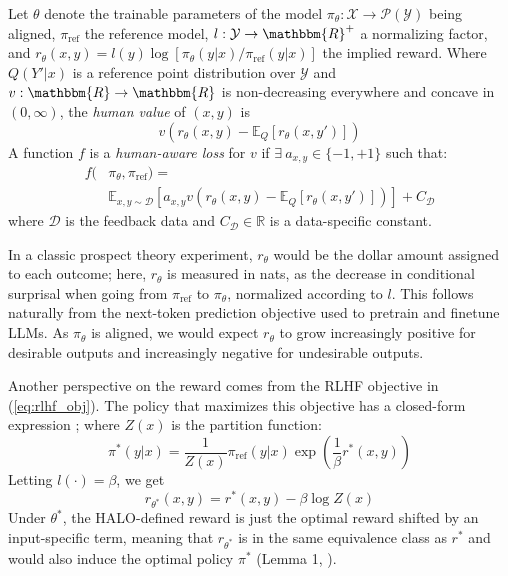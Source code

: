 \begin{definition}
    Let $\theta$ denote the trainable parameters of the model $\pi_\theta: \mathcal{X} \to \mathcal{P}(\mathcal{Y})$ being aligned, $\pi_\text{ref}$ the reference model, $l: \mathcal{Y} \to \mathbbm{R}^+$ a normalizing factor, and $r_\theta(x,y) = {l(y)} \log [\pi_\theta(y|x) / \pi_\text{ref}(y|x)]$ the implied reward.
    Where $Q(Y'|x)$ is a reference point distribution over $\mathcal{Y}$  and $v: \mathbbm{R} \to \mathbbm{R}$ is non-decreasing everywhere and concave in $(0, \infty)$, the \textit{human value} of $(x,y)$ is 
    \begin{equation}
        v(r_\theta(x,y) - \mathbb{E}_{Q}[r_\theta(x,y')])
    \end{equation}
    A function $f$ is a \textit{human-aware loss} for $v$ if $\exists\ a_{x,y} \in \{-1, +1\}$ such that:
    \begin{equation}
    \begin{split}
        f(& \pi_\theta, \pi_\text{ref}) = \\  & \mathbb{E}_{x,y\sim\mathcal{D}}[ a_{x,y} v(r_\theta(x,y) - \mathbb{E}_{Q}[r_\theta(x, y')])] + C_\mathcal{D}
    \end{split}
    \end{equation}
    where $\mathcal{D}$ is the feedback data and $C_\mathcal{D} \in \mathbb{R}$ is a data-specific constant. 
\end{definition}
In a classic prospect theory experiment, $r_\theta$ would be the dollar amount assigned to each outcome; here, $r_\theta$ is measured in nats, as the decrease in conditional surprisal when going from $\pi_\text{ref}$ to $\pi_\theta$, normalized according to $l$.
This follows naturally from the next-token prediction objective used to pretrain and finetune LLMs.
As $\pi_\theta$ is aligned, we would expect $r_\theta$ to grow increasingly positive for desirable outputs and increasingly negative for undesirable outputs.

Another perspective on the reward comes from the RLHF objective in (\ref{eq:rlhf_obj}).
The policy that maximizes this objective has a closed-form expression \citep{peng2019advantage,peters2007reinforcement}; where $Z(x)$ is the partition function:
$$\pi^*(y|x) = \frac{1}{Z(x)} \pi_{\text{ref}}(y|x) \exp\left(\frac{1}{\beta} r^*(x,y)\right)$$
Letting $l(\cdot) = \beta$, we get
\begin{equation}
    r_{\theta^*}(x, y) = r^*(x,y) - \beta \log Z(x)
    \label{eq:opt_reward}
\end{equation}
Under $\theta^*$, the HALO-defined reward is just the optimal reward shifted by an input-specific term, meaning that $r_{\theta^*}$ is in the same equivalence class as $r^*$ and would also induce the optimal policy $\pi^*$ (Lemma 1, \citet{rafailov2023direct}).

